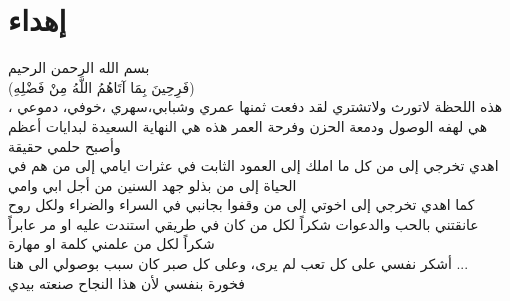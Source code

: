 \chapter*{\textarabic{إهداء}}

\begin{Arabic}
	
\begin{center}
	{\doublespacing
	\fontsize{16pt}{30pt}\selectfont
		بسم الله الرحمن الرحيم\\
	(فَرِحِينَ بِمَا آتَاهُمُ اللَّهُ مِنْ فَضْلِهِ)\\
	هذه اللحظة لاتورث ولاتشتري لقد دفعت ثمنها عمري وشبابي،سهري ،خوفي، دموعي ، هي لهفه الوصول ودمعة الحزن وفرحة العمر هذه هي النهاية السعيدة لبدايات أعظم وأصبح حلمي حقيقة\\
	اهدي تخرجي إلى من كل ما املك إلى العمود الثابت في عثرات ايامي إلى من هم في الحياة إلى من بذلو جهد السنين من أجل ابي وامي\\
	كما اهدي تخرجي إلى اخوتي إلى من وقفوا بجانبي في السراء والضراء ولكل روح عانقتني بالحب والدعوات شكراً لكل من كان في طريقي استندت عليه او مر عابراً شكراً لكل من علمني كلمة او مهارة\\
	أشكر نفسي على كل تعب لم يرى، وعلى كل صبر كان سبب بوصولي الى هنا ...
\\فخورة بنفسي لأن هذا النجاح صنعته بيدي
}\end{center}
\end{Arabic}